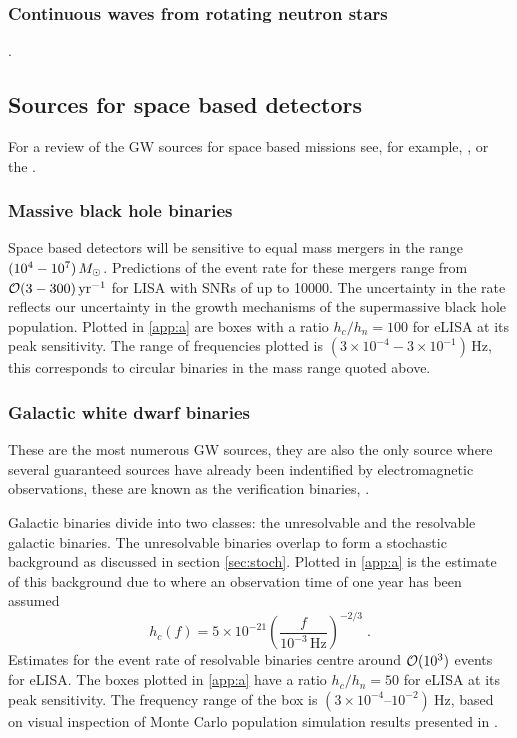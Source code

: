 \subsubsection{Continuous waves from rotating neutron stars}

{.


\subsection{Sources for space based detectors}
For a review of the GW sources for space based missions see, for example, \cite{Amaro-Seoane-et-al}, \cite{Gairetal} or the \cite{eLISAyellowbook}.


\subsubsection{Massive black hole binaries}
Space based detectors will be sensitive to equal mass mergers in the range $(10^{4}-10^{7})\,M_{ \odot }$. Predictions of the event rate for these mergers range from ${\cal{O}}(3-300)\,\textrm{yr}^{-1}$ for LISA with SNRs of up to 10000. The uncertainty in the rate reflects our uncertainty in the growth mechanisms of the supermassive black hole population. Plotted in \ref{app:a} are boxes with a ratio $h_{c}/h_{n}=100$ for eLISA at its peak sensitivity. The range of frequencies plotted is $(3\times 10^{-4}-3\times 10^{-1})\,\textrm{Hz}$, this corresponds to circular binaries in the mass range quoted above.

\subsubsection{Galactic white dwarf binaries} \label{sec:GB}
These are the most numerous GW sources, they are also the only source where several guaranteed sources have already been indentified by electromagnetic observations, these are known as the verification binaries, \cite{2006CQGra..23S.809S}.

Galactic binaries divide into two classes: the unresolvable and the resolvable galactic binaries. The unresolvable binaries overlap to form a stochastic background as discussed in section \ref{sec:stoch}. Plotted in \ref{app:a} is the estimate of this background due to \cite{Nelemans} where an observation time of one year has been assumed
\begin{equation} h_{c}(f)= 5\times 10^{-21} \left(\frac{f}{10^{-3}\,\textrm{Hz}}\right)^{-2/3} \; . \end{equation}
Estimates for the event rate of resolvable binaries centre around ${\cal{O}}(10^{3})$ events for eLISA. The boxes plotted in \ref{app:a} have a ratio $h_{c}/h_{n}=50$ for eLISA at its peak sensitivity. The frequency range of the box is $\left(3\times10^{-4}\right.$--$\left.10^{-2}\right)~\mathrm{Hz}$, based on visual inspection of Monte Carlo population simulation results presented in \cite{Amaro-Seoane-et-al}.

}
